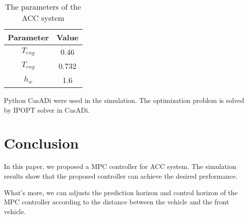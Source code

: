 \documentclass{article}
\numberwithin{equation}{section}
\begin{document}
\begin{table}[h!]
    \centering
    \caption{The parameters of the ACC system}
    \begin{tabular}{|c|c|}
        \hline
        Parameter & Value \\
        \hline
        $T_{eng}$ & 0.46  \\
        \hline
        $T_{eng}$ & 0.732 \\
        \hline
        $h_w$     & 1.6
    \end{tabular}
    \label{tab:parameters}
\end{table}

Python CasADi were used in the simulation. The optimization problem is solved
by IPOPT solver in CasADi.

\section{Conclusion}

In this paper, we proposed a MPC controller for ACC system. The simulation
results show that the proposed controller can achieve the desired performance.

What's more, we can adjusts the prediction horizon and control horizon of the
MPC controller according to the distance between the vehicle and the front
vehicle.



\end{document}
